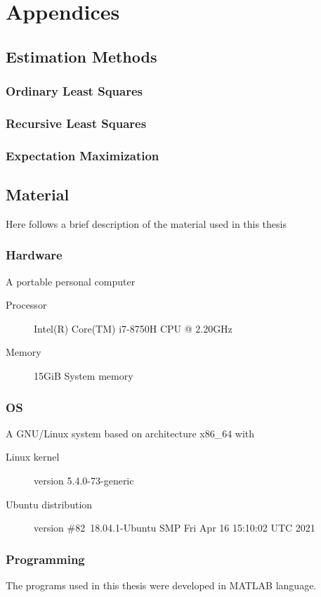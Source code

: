 \documentclass[../main.tex]{subfiles}
\begin{document}
\part{Appendices}
\chapter{Estimation Methods}

\section{Ordinary Least Squares}
\section{Recursive Least Squares}
\section{Expectation Maximization}
\section{}

\chapter{Material}
Here follows a brief description of the material used in this thesis
\section{Hardware}
A portable personal computer
\begin{description}
\item [Processor] Intel(R) Core(TM) i7-8750H CPU @ 2.20GHz
\item [Memory] 15GiB System memory
\end{description}
\section{OS}
A GNU/Linux system based on architecture x86\_64 with
\begin{description}
    \item[Linux kernel] version 5.4.0-73-generic
    \item[Ubuntu distribution] version \#82~18.04.1-Ubuntu SMP Fri Apr 16 15:10:02 UTC 2021
\end{description}

\section{Programming}
The programs used in this thesis were developed in MATLAB language.
\end{document}

